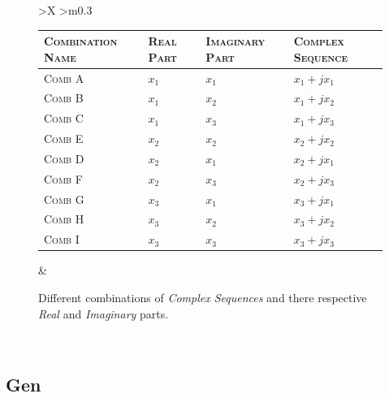 \documentclass[../../course]{subfiles}
\begin{document}
\begin{figure} [H]
    \centering
    \renewcommand{\arraystretch}{1}

    \begin{tabularx} {\textwidth} {
            *{1}{>{\centering\arraybackslash}X}
            *{1}{>{\centering\arraybackslash}m{}}
        }

        { \begin{tabularx} {0.65\textwidth} {
                    *{4}{>{\centering\arraybackslash}X}
                }
                \toprule
                \textsc{Combination Name} & \textsc{Real Part} & \textsc{Imaginary Part} & \textsc{Complex Sequence} \\
                \midrule
                \textsc{Comb A} & $x_{1}$ & $x_{1}$ & $x_{1} + j x_{1}$  \\
                \textsc{Comb B} & $x_{1}$ & $x_{2}$ & $x_{1} + j x_{2}$  \\
                \textsc{Comb C} & $x_{1}$ & $x_{3}$ & $x_{1} + j x_{3}$  \\
                \cmidrule(lr){1-4}
                \textsc{Comb E} & $x_{2}$ & $x_{2}$ & $x_{2} + j x_{2}$  \\
                \textsc{Comb D} & $x_{2}$ & $x_{1}$ & $x_{2} + j x_{1}$  \\
                \textsc{Comb F} & $x_{2}$ & $x_{3}$ & $x_{2} + j x_{3}$  \\
                \cmidrule(lr){1-4}
                \textsc{Comb G} & $x_{3}$ & $x_{1}$ & $x_{3} + j x_{1}$  \\
                \textsc{Comb H} & $x_{3}$ & $x_{2}$ & $x_{3} + j x_{2}$  \\
                \textsc{Comb I} & $x_{3}$ & $x_{3}$ & $x_{3} + j x_{3}$  \\
                \bottomrule
            \end{tabularx} }

            &

             {
                Different combinations of \emph{Complex Sequences} and there respective
                \emph{Real} and \emph{Imaginary} parts.
            }

            \\

    \end{tabularx}


\end{figure}

\subsection{Gen}
\end{document}
